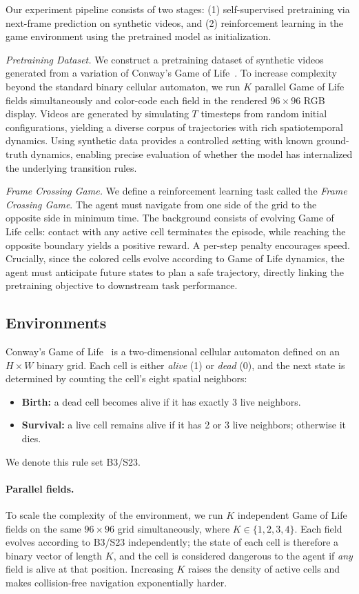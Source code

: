 Our experiment pipeline consists of two stages: (1) self-supervised pretraining via next-frame prediction on synthetic videos, and (2) reinforcement learning in the game environment using the pretrained model as initialization.

\textit{Pretraining Dataset.} We construct a pretraining dataset of synthetic videos generated from a variation of Conway's Game of Life~\citep{gardner1970life}. To increase complexity beyond the standard binary cellular automaton, we run $K$ parallel Game of Life fields simultaneously and color-code each field in the rendered $96 \times 96$ RGB display. Videos are generated by simulating $T$ timesteps from random initial configurations, yielding a diverse corpus of trajectories with rich spatiotemporal dynamics. Using synthetic data provides a controlled setting with known ground-truth dynamics, enabling precise evaluation of whether the model has internalized the underlying transition rules.

\textit{Frame Crossing Game.} We define a reinforcement learning task called the \textit{Frame Crossing Game}. The agent must navigate from one side of the grid to the opposite side in minimum time. The background consists of evolving Game of Life cells: contact with any active cell terminates the episode, while reaching the opposite boundary yields a positive reward. A per-step penalty encourages speed. Crucially, since the colored cells evolve according to Game of Life dynamics, the agent must anticipate future states to plan a safe trajectory, directly linking the pretraining objective to downstream task performance.
\subsection{Environments}

Conway's Game of Life~\citep{gardner1970life} is a two-dimensional cellular automaton defined on an $H \times W$ binary grid.
Each cell is either \emph{alive} (1) or \emph{dead} (0), and the next state is determined by counting the cell's eight spatial neighbors:
\begin{itemize}[nosep]
    \item \textbf{Birth:} a dead cell becomes alive if it has exactly 3 live neighbors.
    \item \textbf{Survival:} a live cell remains alive if it has 2 or 3 live neighbors; otherwise it dies.
\end{itemize}
We denote this rule set B3/S23.

\paragraph{Parallel fields.}
To scale the complexity of the environment, we run $K$ independent Game of Life fields on the same $96 \times 96$ grid simultaneously, where $K \in \{1,2,3,4\}$.
Each field evolves according to B3/S23 independently; the state of each cell is therefore a binary vector of length $K$, and the cell is considered dangerous to the agent if \emph{any} field is alive at that position.
Increasing $K$ raises the density of active cells and makes collision-free navigation exponentially harder.

